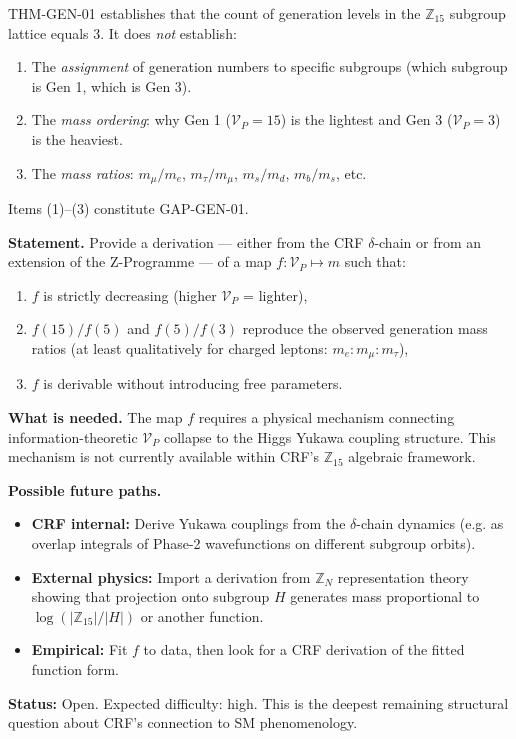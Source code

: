 \documentclass[12pt, a4paper]{article}
\begin{document}
THM-GEN-01 establishes that the count of generation levels in the
$\mathbb{Z}_{15}$ subgroup lattice equals 3. It does \emph{not}
establish:
\begin{enumerate}[leftmargin=*, noitemsep]
  \item The \emph{assignment} of generation numbers to specific
    subgroups (which subgroup is Gen 1, which is Gen 3).
  \item The \emph{mass ordering}: why Gen 1 ($\mathcal{V}_P=15$)
    is the lightest and Gen 3 ($\mathcal{V}_P=3$) is the heaviest.
  \item The \emph{mass ratios}: $m_\mu/m_e$, $m_\tau/m_\mu$,
    $m_s/m_d$, $m_b/m_s$, etc.
\end{enumerate}
Items (1)--(3) constitute GAP-GEN-01.

\begin{openqbox}[title={GAP-GEN-01: Dynamical $\mathcal{V}_P$-to-mass
  map (Open)}]
\label{zc15:gap:mass}
\textbf{Statement.} Provide a derivation — either from the CRF
$\delta$-chain or from an extension of the Z-Programme — of a
map $f: \mathcal{V}_P \mapsto m$ such that:
\begin{enumerate}[leftmargin=*, noitemsep]
  \item $f$ is strictly decreasing (higher $\mathcal{V}_P$ = lighter),
  \item $f(15)/f(5)$ and $f(5)/f(3)$ reproduce the observed
    generation mass ratios (at least qualitatively for charged
    leptons: $m_e : m_\mu : m_\tau$),
  \item $f$ is derivable without introducing free parameters.
\end{enumerate}

\textbf{What is needed.} The map $f$ requires a physical
mechanism connecting information-theoretic $\mathcal{V}_P$
collapse to the Higgs Yukawa coupling structure. This mechanism
is not currently available within CRF's $\mathbb{Z}_{15}$
algebraic framework.

\textbf{Possible future paths.}
\begin{itemize}[leftmargin=*, noitemsep]
  \item \textbf{CRF internal:} Derive Yukawa couplings from
    the $\delta$-chain dynamics (e.g. as overlap integrals of
    Phase-2 wavefunctions on different subgroup orbits).
  \item \textbf{External physics:} Import a derivation from
    $\mathbb{Z}_N$ representation theory showing that
    projection onto subgroup $H$ generates mass proportional
    to $\log(|\mathbb{Z}_{15}|/|H|)$ or another function.
  \item \textbf{Empirical:} Fit $f$ to data, then look for
    a CRF derivation of the fitted function form.
\end{itemize}

\textbf{Status:} Open. Expected difficulty: high.
This is the deepest remaining structural question about CRF's
connection to SM phenomenology.
\end{openqbox}
\end{document}
